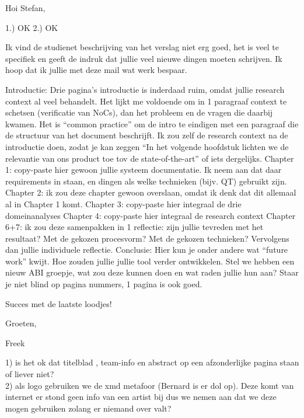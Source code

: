 \documentclass[a4paper,11pt]{report}
\begin{document}
\begin{tcolorbox}[colback=yellow!50]

Hoi Stefan,

1.) OK
2.) OK

Ik vind de studienet beschrijving van het verslag niet erg goed, het is veel te specifiek en geeft de indruk dat jullie veel nieuwe dingen moeten schrijven. Ik hoop dat ik jullie met deze mail wat werk bespaar.

Introductie: Drie pagina's introductie is inderdaad ruim, omdat jullie research context al veel behandelt. Het lijkt me voldoende om in 1 paragraaf context te schetsen (verificatie van NoCs), dan het probleem en de vragen die daarbij kwamen. Het is ``common practice'' om de intro te eindigen met een paragraaf die de structuur van het document beschrijft. Ik zou zelf de research context na de introductie doen, zodat je kan zeggen ``In het volgende hoofdstuk lichten we de relevantie van ons product toe tov de state-of-the-art'' of iets dergelijks.
Chapter 1: copy-paste hier gewoon jullie systeem documentatie. Ik neem aan dat daar requirements in staan, en dingen als welke technieken (bijv. QT) gebruikt zijn.
Chapter 2: ik zou deze chapter gewoon overslaan, omdat ik denk dat dit allemaal al in Chapter 1 komt.
Chapter 3: copy-paste hier integraal de drie domeinanalyses
Chapter 4: copy-paste hier integraal de research context
Chapter 6+7: ik zou deze samenpakken in 1 reflectie: zijn jullie tevreden met het resultaat? Met de gekozen procesvorm? Met de gekozen technieken? Vervolgens dan jullie individuele reflectie.
Conclusie: Hier kun je onder andere wat ``future work'' kwijt. Hoe zouden jullie jullie tool verder ontwikkelen. Stel we hebben een nieuw ABI groepje, wat zou deze kunnen doen en wat raden jullie hun aan? Staar je niet blind op pagina nummers, 1 pagina is ook goed.

Succes met de laatste loodjes!

Groeten,

Freek

\end{tcolorbox}



\begin{tcolorbox}[colback=yellow!30]
  1) is het ok dat titelblad , team-info en abstract op een afzonderlijke pagina staan of liever niet? \\
  2) als logo gebruiken we de xmd metafoor (Bernard is er dol op). Deze komt van internet er 
  stond geen info van een artist bij dus we nemen aan dat we deze mogen gebruiken
  zolang er niemand over valt?
\end{tcolorbox}
\end{document}
